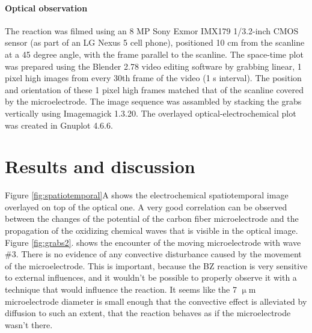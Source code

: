 \documentclass[3p, twocolumn]{elsarticle}
\begin{document}
\paragraph{Optical observation}
The reaction was filmed using an 8 MP Sony Exmor IMX179 1/3.2-inch CMOS sensor (as part of an LG Nexus 5 cell phone), positioned 10 cm from the scanline at a 45 degree angle, with the frame parallel to the scanline.
The space-time plot was prepared using the Blender 2.78 video editing software by grabbing linear, 1 pixel high images from every 30th frame of the video (1 s interval).
The position and orientation of these 1 pixel high frames matched that of the scanline covered by the microelectrode.
The image sequence was assambled by stacking the grabs vertically using Imagemagick 1.3.20.
The overlayed optical-electrochemical plot was created in Gnuplot 4.6.6.



\section{Results and discussion}

Figure \ref{fig:spatiotemporal}A shows the electrochemical spatiotemporal image overlayed on top of the optical one.
A very good correlation can be observed between the changes of the potential of the carbon fiber microelectrode and the propagation of the oxidizing chemical waves that is visible in the optical image.
Figure \ref{fig:grabs2}. shows the encounter of the moving microelectrode with wave \#3.
There is no evidence of any convective disturbance caused by the movement of the microelectrode.
This is important, because the BZ reaction is very sensitive to external influences, and it wouldn't be possible to properly observe it with a technique that would influence the reaction.
It seems like the 7 $\upmu$m microelectrode diameter is small enough that the convective effect is alleviated by diffusion to such an extent, that the reaction behaves as if the microelectrode wasn't there.

\end{document}
